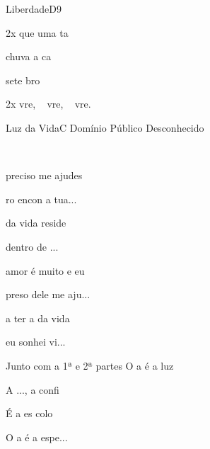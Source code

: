 \documentclass[a4,12pt,oneside]{book}
\newcommand{\RevDate}{\today}
\newcommand{\NotCCLIed}{\relax}
\renewcommand{\SBPubDom}{Domínio Público}
\begin{document}
\begin{song}{Liberdade}{D9}
	\begin{SBBracket}{2x}
		  que uma ta
		
		 chuva a ca
		
		 sete bro
	\end{SBBracket}
	
	\begin{SBBracket}{2x}
		vre, ~ vre, ~ vre.
	\end{SBBracket}
\end{song} 


\begin{song}{Luz da Vida}{C}
  {\SBPubDom}
  {Desconhecido}
  {}
  {\NotCCLIed}
  
	\renewcommand{\RevDate}{12 de maio de 2014}
  
	
	\ifChordBk
		{\vspace{-1em}\flushright{\Cchord \quad \GBchord \quad \GBbchord \quad \Aschord \quad \Dmchord \quad \DmCchord \quad \Gschord}\\}
	\fi
		
	\begin{SBVerse}
		 preciso  me ajudes
		
		ro encon a tua...
		
		 da vida  reside
		
		 dentro de ...
	\end{SBVerse}
	
	\begin{SBVerse}
		 amor é muito  e eu
		
		preso dele  me aju...
		
		 a ter a  da vida
		
		 eu sonhei vi\Chr{C}{ver}...
	\end{SBVerse}
	
	\begin{SBBracket}{Junto com a 1ª e 2ª partes}
		O a  é a luz 
		
		A ...,  a confi
		
		É a es colo
		
		O a é a espe...
	\end{SBBracket}
\end{song}
\end{document}
